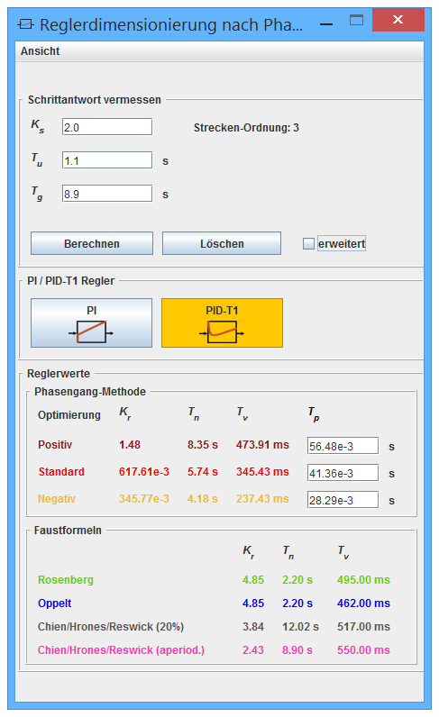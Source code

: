 \begin{minipage}[t][][b]{0.45\textwidth}
    \centering

    \begin{minipage}[c][][b]{\textwidth}
        \includegraphics[width=\textwidth]{images/toolStartPIDSmall.jpg}
        \label{fig:toolStartPIDSmall}
    \end{minipage}


\end{minipage}
